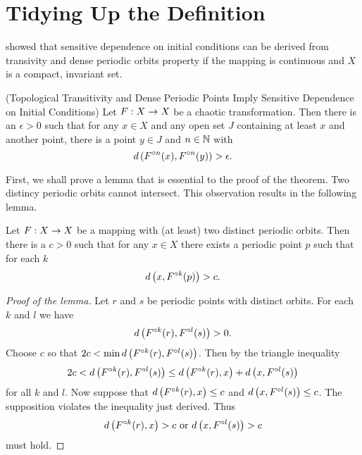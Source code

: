 \documentclass[12pt,draft,twoside]{book}
\begin{document}
\section{Tidying Up the Definition}
\citet{banks} showed that sensitive dependence on initial conditions can be derived from transivity and dense periodic orbits property if the mapping is continuous and $X$ is a compact, invariant set. 

\begin{theorem}
  (Topological Transitivity and Dense Periodic Points Imply Sensitive Dependence on Initial Conditions)
  Let $F: X\rightarrow X$ be a chaotic transformation. Then there is an $\epsilon > 0$ such that
  for any $x\in X$ and any open set $J$ containing at least $x$ and another point, there is
  a point $y\in J$ and $n\in \mathbb{N}$ with
  \begin{equation*}
    d\left( F^{\circ n}(x),F^{\circ n}(y) \right) > \epsilon.
  \end{equation*}
  \label{thm:banks}
\end{theorem}
First, we shall prove a lemma that is essential to the proof of the theorem.
Two distincy periodic orbits cannot intersect.
This observation results in the following lemma.
\begin{lemma}
  Let $F: X\rightarrow X$ be a mapping with (at least) two distinct periodic orbits.
  Then there is a $c > 0$ such that for any $x\in X$ there exists a periodic
  point $p$ such that for each $k$
  \begin{equation*}
    d\left( x, F^{\circ k}(p) \right) > c.
  \end{equation*}
  \label{lem:dev1}
\begin{proof}[Proof of the lemma]
  Let $r$ and $s$ be periodic points with distinct orbits. For each $k$ and $l$ we have
  \begin{equation*}
    d\left( F^{\circ k}(r), F^{\circ l}(s) \right) > 0.
  \end{equation*}
  Choose $c$ so that $2c < \min d\left( F^{\circ k}(r),F^{\circ l}(s) \right)$.
  Then by the triangle inequality
  \begin{equation*}
    2c < d\left( F^{\circ k}(r),F^{\circ l}(s) \right) \leq d\left( F^{\circ k}(r),x \right) + d\left( x,F^{\circ l}(s) \right)
  \end{equation*}
  for all $k$ and $l$.
  Now suppose that $d\left( F^{\circ k}(r),x \right) \leq c$ and $d\left( x,F^{\circ l}(s) \right) \leq c$. The supposition
  violates the inequality just derived. Thus 
  \begin{equation*}
    d\left( F^{\circ k}(r),x \right) > c \mbox{ or } d\left( x,F^{\circ l}(s) \right) > c
  \end{equation*}
  must hold.
\end{proof}
\end{lemma}
\end{document}
